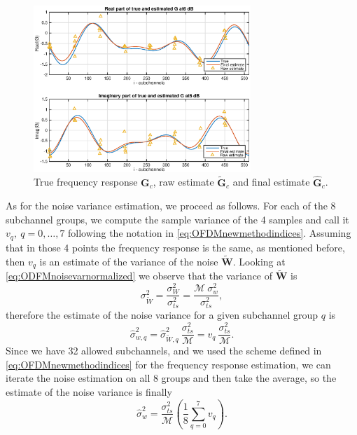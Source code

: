 \documentclass[10pt]{article}
\newcommand{\ofdM} {\mathcal{M}}
\begin{document}
\begin{figure}
	\centering
	\includegraphics[width = 0.73\textwidth]{p3_newmethodexample}
	\caption{True frequency response $\mathbf{G}_c$, raw estimate $\mathbf{\tilde{G}}_c$ and final estimate $\mathbf{\hat{G}}_c$.}
	\label{fig:p3_newmethodexample}
\end{figure}

As for the noise variance estimation, we proceed as follows. For each of the 8 subchannel groups, we compute the sample variance of the 4 samples and call it $v_q,\ q\!=\!0,\ldots,7$ following the notation in \eqref{eq:OFDMnewmethodindices}. Assuming that in those 4 points the frequency response is the same, as mentioned before, then $v_q$ is an estimate of the variance of the noise $\mathbf{\tilde{W}}$. Looking at \eqref{eq:ODFMnoisevarnormalized} we observe that the variance of $\mathbf{\tilde{W}}$ is
\begin{equation}
	\sigma_{\tilde{W}}^2 = \dfrac{\sigma_W^2}{\sigma_{ts}^2} = \dfrac{\ofdM \: \sigma_w^2}{\sigma_{ts}^2},
\end{equation}
therefore the estimate of the noise variance for a given subchannel group $q$ is
\begin{equation}
	\hat{\sigma}_{w,q}^2 = \hat{\sigma}_{\tilde{W}, q}^2 \: \dfrac{\sigma_{ts}^2}{\ofdM} = v_q \: \dfrac{\sigma_{ts}^2}{\ofdM}.
\end{equation}
Since we have 32 allowed subchannels, and we used the scheme defined in \eqref{eq:OFDMnewmethodindices} for the frequency response estimation, we can iterate the noise estimation on all 8 groups and then take the average, so the estimate of the noise variance is finally
\begin{equation}
	\hat{\sigma}_w^2 = \dfrac{\sigma_{ts}^2}{\ofdM} \left( \frac{1}{8} \sum_{q=0}^{7} v_q \right).
	\label{eq:noisepwrest_newmethod}
\end{equation}
\end{document}
